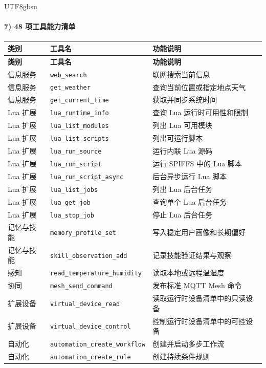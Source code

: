 \documentclass[a4paper,12pt]{article}
\begin{document}
\begin{CJK*}{UTF8}{gbsn}
\paragraph{7) 48 项工具能力清单}
\begin{longtable}{p{2.8cm}p{3.6cm}p{8.0cm}}
\toprule
\textbf{类别} & \textbf{工具名} & \textbf{功能说明} \\
\midrule
\endfirsthead
\toprule
\textbf{类别} & \textbf{工具名} & \textbf{功能说明} \\
\midrule
\endhead
信息服务 & \texttt{web\_search} & 联网搜索当前信息 \\
信息服务 & \texttt{get\_weather} & 查询当前位置或指定地点天气 \\
信息服务 & \texttt{get\_current\_time} & 获取并同步系统时间 \\
Lua 扩展 & \texttt{lua\_runtime\_info} & 查询 Lua 运行时可用性和限制 \\
Lua 扩展 & \texttt{lua\_list\_modules} & 列出 Lua 可用模块 \\
Lua 扩展 & \texttt{lua\_list\_scripts} & 列出可运行脚本 \\
Lua 扩展 & \texttt{lua\_run\_source} & 运行内联 Lua 源码 \\
Lua 扩展 & \texttt{lua\_run\_script} & 运行 SPIFFS 中的 Lua 脚本 \\
Lua 扩展 & \texttt{lua\_run\_script\_async} & 后台异步运行 Lua 脚本 \\
Lua 扩展 & \texttt{lua\_list\_jobs} & 列出 Lua 后台任务 \\
Lua 扩展 & \texttt{lua\_get\_job} & 查询单个 Lua 后台任务 \\
Lua 扩展 & \texttt{lua\_stop\_job} & 停止 Lua 后台任务 \\
记忆与技能 & \texttt{memory\_profile\_set} & 写入稳定用户画像和长期偏好 \\
记忆与技能 & \texttt{skill\_observation\_add} & 记录技能验证结果与观察 \\
感知 & \texttt{read\_temperature\_humidity} & 读取本地或远程温湿度 \\
协同 & \texttt{mesh\_send\_command} & 发布标准 MQTT Mesh 命令 \\
扩展设备 & \texttt{virtual\_device\_read} & 读取运行时设备清单中的只读设备 \\
扩展设备 & \texttt{virtual\_device\_control} & 控制运行时设备清单中的可控设备 \\
自动化 & \texttt{automation\_create\_workflow} & 创建并启动多步工作流 \\
自动化 & \texttt{automation\_create\_rule} & 创建持续条件规则 \\

\end{longtable}
\end{CJK*}
\end{document}
